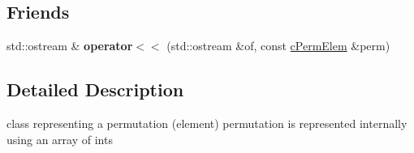 \subsection*{\-Friends}
\begin{DoxyCompactItemize}
\item 
\hypertarget{classcPermElem_a4211aa547f8e3f2dc6b44ad07f7224db}{std\-::ostream \& {\bfseries operator$<$$<$} (std\-::ostream \&of, const \hyperlink{classcPermElem}{c\-Perm\-Elem} \&perm)}\label{classcPermElem_a4211aa547f8e3f2dc6b44ad07f7224db}

\end{DoxyCompactItemize}


\subsection{\-Detailed \-Description}
class representing a permutation (element) permutation is represented internally using an array of ints 

